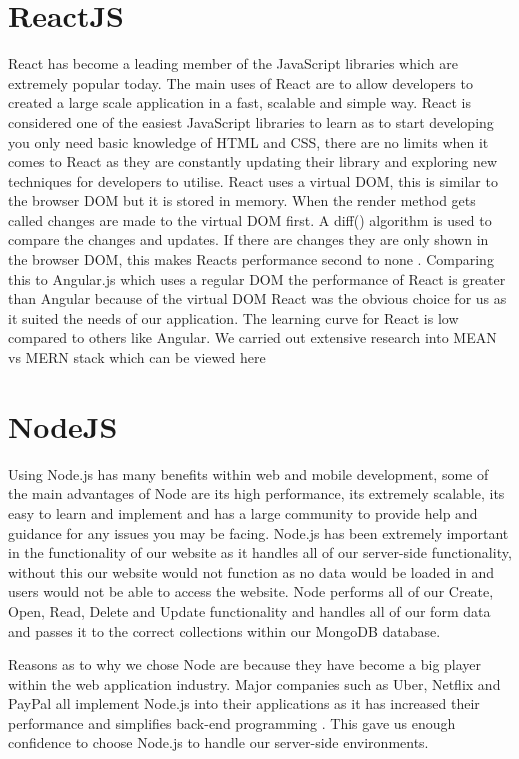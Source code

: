 \section{ReactJS}
React has become a leading member of the JavaScript libraries which are extremely popular today. The main uses of React are to allow developers to created a large scale application in a fast, scalable and simple way. React is considered one of the easiest JavaScript libraries to learn as to start developing you only need basic knowledge of HTML and CSS, there are no limits when it comes to React as they are constantly updating their library and exploring new techniques for developers to utilise. 
React uses a virtual DOM, this is similar to the browser DOM but it is stored in memory. When the render method gets called changes are made to the virtual DOM first. A diff() algorithm is used to compare the changes and updates. If there are changes they are only shown in the browser DOM, this makes Reacts performance second to none \cite{aggarwal2018modern}. Comparing this to Angular.js which uses a regular DOM the performance of React is greater than Angular because of the virtual DOM \cite{kumar2016comparative}
React was the obvious choice for us as it suited the needs of our application. The learning curve for React is low compared to others like Angular. We carried out extensive research into MEAN vs MERN stack which can be viewed here \pageref{Section:Stack Comparison: MEAN vs MERN} 
\newline

\section{NodeJS}
Using Node.js has many benefits within web and mobile development, some of the main advantages of Node are its high performance, its extremely scalable, its easy to learn and implement and has a large community to provide help and guidance for any issues you may be facing. Node.js has been extremely important in the functionality of our website as it handles all of our server-side functionality, without this our website would not function as no data would be loaded in and users would not be able to access the website. Node performs all of our Create, Open, Read, Delete and Update functionality and handles all of our form data and passes it to the correct collections within our MongoDB database. 

Reasons as to why we chose Node are because they have become a big player within the web application industry. Major companies such as Uber, Netflix and PayPal all implement Node.js into their applications as it has increased their performance and simplifies back-end programming \cite{netflixnode}. This gave us enough confidence to choose Node.js to handle our server-side environments. 

